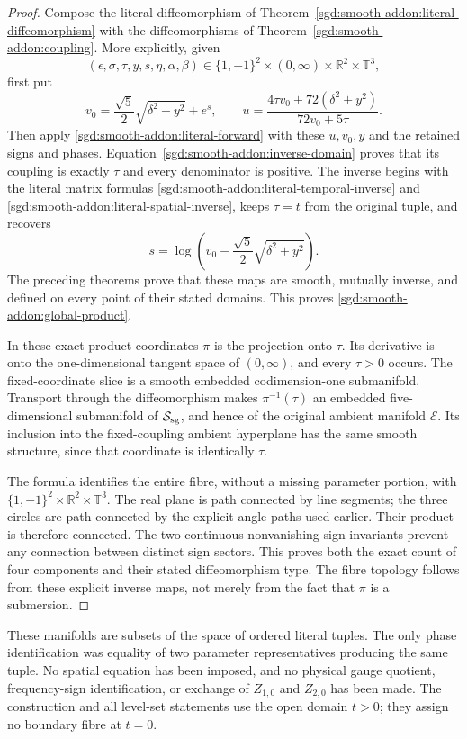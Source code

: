 \begin{proof}
Compose the literal diffeomorphism of
Theorem~\ref{sgd:smooth-addon:literal-diffeomorphism} with
the diffeomorphisms of
Theorem~\ref{sgd:smooth-addon:coupling}. More explicitly, given
\[
 (\epsilon,\sigma,\tau,y,s,\eta,\alpha,\beta)
 \in\{1,-1\}^2\times(0,\infty)\times\mathbb R^2\times\mathbb T^3,
\]
first put
\[
 v_0=\frac{\sqrt5}{2}\sqrt{\delta^2+y^2}+e^s,\qquad
 u=\frac{4\tau v_0+72(\delta^2+y^2)}{72v_0+5\tau}.
\]
Then apply \eqref{sgd:smooth-addon:literal-forward} with these
$u,v_0,y$ and the retained signs and phases.
Equation~\eqref{sgd:smooth-addon:inverse-domain} proves that its
coupling is exactly $\tau$ and every denominator is positive.
The inverse begins with the literal matrix formulas
\eqref{sgd:smooth-addon:literal-temporal-inverse} and
\eqref{sgd:smooth-addon:literal-spatial-inverse}, keeps
$\tau=t$ from the original tuple, and recovers
\[
 s=\log\!\left(v_0-\frac{\sqrt5}{2}\sqrt{\delta^2+y^2}\right).
\]
The preceding theorems prove that these maps are smooth, mutually
inverse, and defined on every point of their stated domains.
This proves \eqref{sgd:smooth-addon:global-product}.

In these exact product coordinates $\pi$ is the projection onto
$\tau$. Its derivative is onto the one-dimensional tangent space
of $(0,\infty)$, and every $\tau>0$ occurs.
The fixed-coordinate slice is a smooth embedded codimension-one
submanifold. Transport through the diffeomorphism makes
$\pi^{-1}(\tau)$ an embedded five-dimensional submanifold of
$\mathcal S_{\rm sg}$, and hence of the original ambient manifold
$\mathcal E$. Its inclusion into the fixed-coupling ambient
hyperplane has the same smooth structure, since that coordinate is
identically $\tau$.

The formula identifies the entire fibre, without a missing
parameter portion, with
$\{1,-1\}^2\times\mathbb R^2\times\mathbb T^3$.
The real plane is path connected by line segments; the three
circles are path connected by the explicit angle paths used
earlier. Their product is therefore connected.
The two continuous nonvanishing sign invariants prevent any
connection between distinct sign sectors. This proves both
the exact count of four components and their stated diffeomorphism
type. The fibre topology follows from these explicit inverse maps,
not merely from the fact that $\pi$ is a submersion.
\end{proof}

These manifolds are subsets of the space of ordered literal tuples.
The only phase identification was equality of two parameter
representatives producing the same tuple. No spatial equation has
been imposed, and no physical gauge quotient, frequency-sign
identification, or exchange of $Z_{1,0}$ and $Z_{2,0}$ has been made.
The construction and all level-set statements use the open domain
$t>0$; they assign no boundary fibre at $t=0$.
